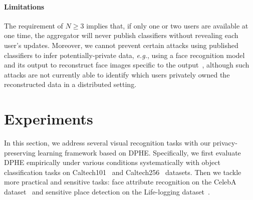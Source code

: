 \documentclass[10pt,twocolumn,letterpaper]{article}
\def\vct#1{\mbox{\boldmath $#1$}}
\def\eg{{\it e.g.}}
\def\ui#1{^{(#1)}}
\def\perm{\vct{\phi}}
\def\dperm#1{\vct{\Phi}\left(#1\right)}
\begin{document}

\paragraph{Limitations} The requirement of $N\geq 3$ implies that, if only one or two users are available at one time, the aggregator will never publish classifiers without revealing each user's updates. Moreover, we cannot prevent certain attacks using published classifiers to infer potentially-private data, \eg, using a face recognition model and its output to reconstruct face images specific to the output~\cite{Fredrikson2015}, although such attacks are not currently able to identify which users privately owned the reconstructed data in a distributed setting.

\section{Experiments}
\label{sec:exp}
In this section, we address several visual recognition tasks with our privacy-preserving learning framework based on DPHE. Specifically, we first evaluate DPHE empirically under various conditions systematically with object classification tasks on Caltech101~\cite{Fei-Fei2007a} and Caltech256~\cite{Griffin2007a} datasets. Then we tackle more practical and sensitive tasks: face attribute recognition on the CelebA dataset~\cite{Liu2015a} and sensitive place detection on the Life-logging dataset~\cite{Fan2016a}.
\end{document}
